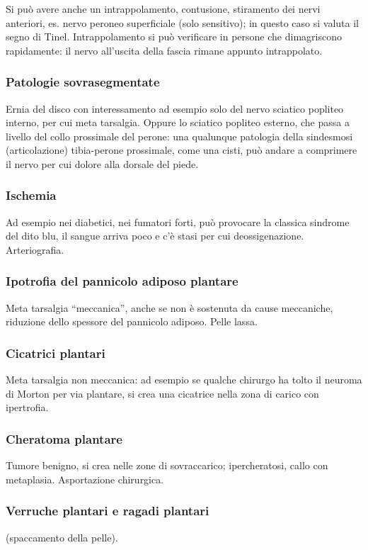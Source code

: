 Si può avere anche un intrappolamento, contusione, stiramento dei nervi anteriori, es. nervo peroneo superficiale (solo sensitivo); in questo caso si valuta il segno di Tinel. Intrappolamento si può verificare in
persone che dimagriscono rapidamente: il nervo all'uscita della fascia rimane appunto intrappolato.

\subsubsection{Patologie sovrasegmentate}

Ernia del disco con interessamento ad esempio solo del nervo sciatico popliteo interno, per cui meta tarsalgia. Oppure lo sciatico popliteo esterno, che passa a livello del collo prossimale del perone: una qualunque patologia della sindesmosi (articolazione) tibia-perone prossimale, come una cisti, può andare a comprimere il nervo per cui
dolore alla dorsale del piede.

\subsubsection{Ischemia}

Ad esempio nei diabetici, nei fumatori forti, può provocare la classica sindrome del dito blu, il sangue arriva poco e c'è stasi per cui deossigenazione. Arteriografia.

\subsubsection{Ipotrofia del pannicolo adiposo plantare}
Meta tarsalgia ``meccanica'', anche se non è sostenuta da cause meccaniche, riduzione dello spessore del pannicolo adiposo. Pelle lassa.

\subsubsection{Cicatrici plantari}
Meta tarsalgia non meccanica: ad esempio se qualche chirurgo ha tolto il neuroma di Morton per via plantare, si crea una cicatrice nella zona di carico con ipertrofia.

\subsubsection{Cheratoma plantare}
Tumore benigno, si crea nelle zone di sovraccarico; ipercheratosi, callo con metaplasia. Asportazione chirurgica.

\subsubsection{Verruche plantari e ragadi plantari}
(spaccamento della pelle).


